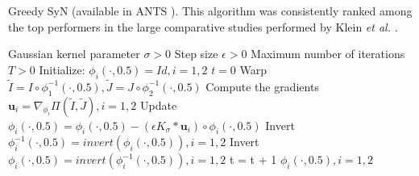 \begin{algorithm}[h!]
\caption{{\small Greedy SyN (available in ANTS \cite{Avants2011}). This algorithm was consistently ranked among the top performers in the large comparative studies performed by Klein {\it et al.} \cite{Klein2009, Klein2010}.}}\label{alg:Greedy_SyN}
\begin{algorithmic}[1]
\REQUIRE Gaussian kernel parameter $\sigma>0$
\REQUIRE Step size $\epsilon>0$
\REQUIRE Maximum number of iterations $T>0$
\STATE Initialize: $\phi_{i}(\cdot, 0.5) = Id, i=1, 2$
\STATE $t=0$
\REPEAT
    \STATE Warp $\tilde{I}  = I \circ \phi_{1}^{-1}(\cdot, 0.5), \tilde{J} = J \circ \phi_{2}^{-1}(\cdot, 0.5)$
    \STATE Compute the gradients $\mathbf{u}_{i} = \nabla_{\phi_{i}} \Pi(\tilde{I}, \tilde{J}), i=1,2$
    \STATE Update $\phi_{i}(\cdot, 0.5) = \phi_{i}(\cdot, 0.5) - \left( \epsilon K_{\sigma} \ast \mathbf{u}_{i} \right) \circ \phi_{i}(\cdot, 0.5)$
    \STATE Invert $\phi_{i}^{-1}(\cdot, 0.5) = invert (\phi_{i}(\cdot, 0.5)), i=1, 2$
    \STATE Invert $\phi_{i}(\cdot, 0.5) = invert (\phi_{i}^{-1}(\cdot, 0.5)), i=1, 2$
    \STATE t = t + 1
\RETURN $\phi_{i}(\cdot, 0.5), i=1,2$
\end{algorithmic}
\end{algorithm}\figcloser

